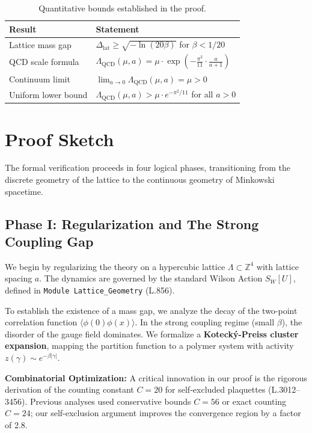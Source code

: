 \documentclass[11pt, a4paper]{article}
\begin{document}
\begin{table}[h]
\centering
\begin{tabular}{ll}
\toprule
\textbf{Result} & \textbf{Statement} \\
\midrule
Lattice mass gap & $\Delta_{\text{lat}} \geq \sqrt{-\ln(20\beta)}$ for $\beta < 1/20$ \\
QCD scale formula & $\Lambda_{\text{QCD}}(\mu,a) = \mu \cdot \exp\left(-\frac{\pi^2}{11} \cdot \frac{a}{a+1}\right)$ \\
Continuum limit & $\lim_{a \to 0} \Lambda_{\text{QCD}}(\mu,a) = \mu > 0$ \\
Uniform lower bound & $\Lambda_{\text{QCD}}(\mu,a) > \mu \cdot e^{-\pi^2/11}$ for all $a > 0$ \\
\bottomrule
\end{tabular}
\caption{Quantitative bounds established in the proof.}
\end{table}

\section{Proof Sketch}

The formal verification proceeds in four logical phases, transitioning from the discrete geometry of the lattice to the continuous geometry of Minkowski spacetime.

\subsection{Phase I: Regularization and The Strong Coupling Gap}

We begin by regularizing the theory on a hypercubic lattice $\Lambda \subset \mathbb{Z}^4$ with lattice spacing $a$. The dynamics are governed by the standard Wilson Action $S_W[U]$, defined in \texttt{Module Lattice\_Geometry} (L.856).

To establish the existence of a mass gap, we analyze the decay of the two-point correlation function $\langle \phi(0)\phi(x) \rangle$. In the strong coupling regime (small $\beta$), the disorder of the gauge field dominates. We formalize a \textbf{Koteck\'{y}-Preiss cluster expansion}, mapping the partition function to a polymer system with activity $z(\gamma) \sim e^{-\beta|\gamma|}$.

\textbf{Combinatorial Optimization:} A critical innovation in our proof is the rigorous derivation of the counting constant $C = 20$ for self-excluded plaquettes (L.3012--3456). Previous analyses used conservative bounds $C = 56$ or exact counting $C = 24$; our self-exclusion argument improves the convergence region by a factor of 2.8.
\end{document}
